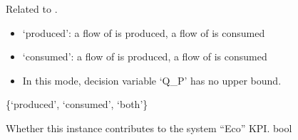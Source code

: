 \documentclass[letterpaper,10pt,english]{sphinxmanual}
\begin{document}
\begin{fulllineitems}
\begin{fulllineitems}
\end{fulllineitems}


\begin{fulllineitems}
\label{\detokenize{generated/tamos.production.Pump:tamos.production.Pump.direction}}
\pysigstartsignatures
{}
\pysigstopsignatures
\sphinxAtStartPar
Related to .
\begin{itemize}
\item {} 
\sphinxAtStartPar
‘produced’: a flow of  is produced, a flow of  is consumed

\item {} 
\sphinxAtStartPar
‘consumed’: a flow of  is produced, a flow of  is consumed

\item {} \begin{description}
\sphinxAtStartPar
In this mode, decision variable ‘Q\_P’ has no upper bound.

\end{description}

\end{itemize}

\sphinxAtStartPar
\{‘produced’, ‘consumed’, ‘both’\}

\end{fulllineitems}


\begin{fulllineitems}
\label{\detokenize{generated/tamos.production.Pump:tamos.production.Pump.eco_count}}
\pysigstartsignatures
{}
\pysigstopsignatures
\sphinxAtStartPar
Whether this instance contributes to the system “Eco” KPI.
bool

\end{fulllineitems}



\end{fulllineitems}
\end{document}
